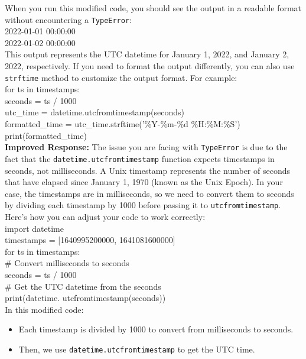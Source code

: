 \begin{promptbox}
When you run this modified code, you should see the output in a readable format without encountering a \texttt{TypeError}:\\

2022-01-01 00:00:00\\
2022-01-02 00:00:00\\

This output represents the UTC datetime for January 1, 2022, and January 2, 2022, respectively. If you need to format the output differently, you can also use \texttt{strftime} method to customize the output format. For example:\\

for ts in timestamps:\\
    seconds = ts / 1000\\
    utc\_time = datetime.utcfromtimestamp(seconds)\\
    formatted\_time = utc\_time.strftime('\%Y-\%m-\%d \%H:\%M:\%S')\\
    print(formatted\_time) \\

\textbf{Improved Response: }
The issue you are facing with \texttt{TypeError} is due to the fact that the \texttt{datetime.utcfromtimestamp} function expects timestamps in seconds, not milliseconds. A Unix timestamp represents the number of seconds that have elapsed since January 1, 1970 (known as the Unix Epoch). In your case, the timestamps are in milliseconds, so we need to convert them to seconds by dividing each timestamp by 1000 before passing it to \texttt{utcfromtimestamp}. Here's how you can adjust your code to work correctly:\\

import datetime\\
timestamps = [1640995200000, 1641081600000]\\
for ts in timestamps:\\
    \# Convert milliseconds to seconds\\
    seconds = ts / 1000\\
    \# Get the UTC datetime from the seconds\\
    print(datetime. utcfromtimestamp(seconds))\\

In this modified code:
\begin{itemize}
\item Each timestamp is divided by 1000 to convert from milliseconds to seconds.
\item Then, we use \texttt{datetime.utcfromtimestamp} to get the UTC time.
\end{itemize}


\end{promptbox}
